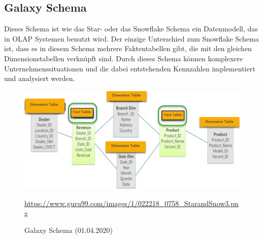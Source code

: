 \subsection{Galaxy Schema}\label{ssec:Galaxy-Schema}
Dieses Schema ist wie das Star- oder das Snowflake Schema ein Datenmodell, das in OLAP Systemen benutzt wird. Der einzige Unterschied zum Snowflake Schema ist, dass es in diesem Schema mehrere Faktentabellen gibt, die mit den gleichen Dimensionstabellen verknüpft sind. Durch dieses Schema können komplexere Unternehmenssituationen und die dabei entstehenden Kennzahlen implementiert und analysiert werden.
\begin{figure}[H]
\centering
  \includegraphics[scale=0.5]{images/Galaxy.png}
  \caption[Galaxy Schema (01.04.2020)]{Galaxy Schema (01.04.2020)}
  \label{fig:Galaxy-Schema}
  \url{https://www.guru99.com/images/1/022218_0758_StarandSnow3.png}
\end{figure}
\newpage
